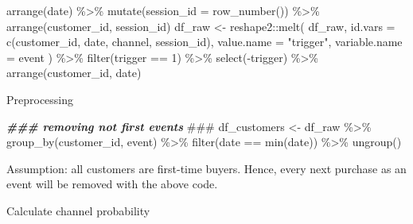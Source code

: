 \documentclass[
]{book}
\newenvironment{Shaded}{\begin{snugshade}}{\end{snugshade}}
\newcommand{\AlertTok}[1]{\textcolor[rgb]{0.94,0.16,0.16}{#1}}
\newcommand{\AttributeTok}[1]{\textcolor[rgb]{0.77,0.63,0.00}{#1}}
\newcommand{\DecValTok}[1]{\textcolor[rgb]{0.00,0.00,0.81}{#1}}
\newcommand{\DocumentationTok}[1]{\textcolor[rgb]{0.56,0.35,0.01}{\textbf{\textit{#1}}}}
\newcommand{\FunctionTok}[1]{\textcolor[rgb]{0.00,0.00,0.00}{#1}}
\newcommand{\NormalTok}[1]{#1}
\newcommand{\OtherTok}[1]{\textcolor[rgb]{0.56,0.35,0.01}{#1}}
\newcommand{\SpecialCharTok}[1]{\textcolor[rgb]{0.00,0.00,0.00}{#1}}
\newcommand{\StringTok}[1]{\textcolor[rgb]{0.31,0.60,0.02}{#1}}
\begin{document}
\begin{Shaded}
\begin{Highlighting}[]
  \FunctionTok{arrange}\NormalTok{(date) }\SpecialCharTok{\%\textgreater{}\%}
  \FunctionTok{mutate}\NormalTok{(}\AttributeTok{session\_id =} \FunctionTok{row\_number}\NormalTok{()) }\SpecialCharTok{\%\textgreater{}\%}
  \FunctionTok{arrange}\NormalTok{(customer\_id, session\_id)}
\NormalTok{df\_raw }\OtherTok{\textless{}{-}}
\NormalTok{  reshape2}\SpecialCharTok{::}\FunctionTok{melt}\NormalTok{(}
\NormalTok{    df\_raw,}
    \AttributeTok{id.vars =} \FunctionTok{c}\NormalTok{(}\StringTok{\textquotesingle{}customer\_id\textquotesingle{}}\NormalTok{, }\StringTok{\textquotesingle{}date\textquotesingle{}}\NormalTok{, }\StringTok{\textquotesingle{}channel\textquotesingle{}}\NormalTok{, }\StringTok{\textquotesingle{}session\_id\textquotesingle{}}\NormalTok{),}
    \AttributeTok{value.name =} \StringTok{"trigger"}\NormalTok{,}
    \AttributeTok{variable.name =} \StringTok{\textquotesingle{}event\textquotesingle{}}
\NormalTok{  ) }\SpecialCharTok{\%\textgreater{}\%}
  \FunctionTok{filter}\NormalTok{(trigger }\SpecialCharTok{==} \DecValTok{1}\NormalTok{) }\SpecialCharTok{\%\textgreater{}\%}
  \FunctionTok{select}\NormalTok{(}\SpecialCharTok{{-}}\NormalTok{trigger) }\SpecialCharTok{\%\textgreater{}\%}
  \FunctionTok{arrange}\NormalTok{(customer\_id, date)}
\end{Highlighting}
\end{Shaded}

Preprocessing

\begin{Shaded}
\begin{Highlighting}[]
\DocumentationTok{\#\#\# removing not first events }\AlertTok{\#\#\#}
\NormalTok{df\_customers }\OtherTok{\textless{}{-}}\NormalTok{ df\_raw }\SpecialCharTok{\%\textgreater{}\%}
  \FunctionTok{group\_by}\NormalTok{(customer\_id, event) }\SpecialCharTok{\%\textgreater{}\%}
  \FunctionTok{filter}\NormalTok{(date }\SpecialCharTok{==} \FunctionTok{min}\NormalTok{(date)) }\SpecialCharTok{\%\textgreater{}\%}
  \FunctionTok{ungroup}\NormalTok{()}
\end{Highlighting}
\end{Shaded}

Assumption: all customers are first-time buyers. Hence, every next purchase as an event will be removed with the above code.

Calculate channel probability
\end{document}

